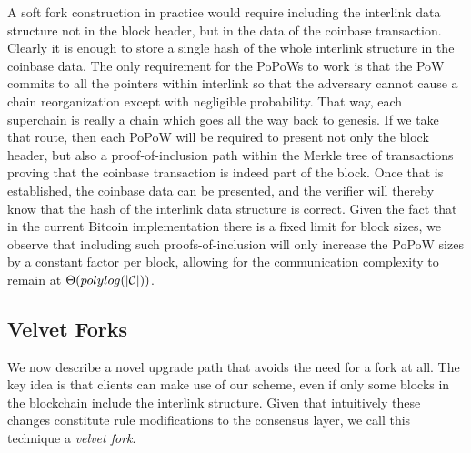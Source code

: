   A soft fork construction in practice would require including the interlink data structure
not in the block header, but in the data of the coinbase transaction.  Clearly
it is enough to store a single hash of the whole interlink structure in the
coinbase data. The only requirement for the PoPoWs to work is that the
PoW commits to all the pointers within interlink so that the adversary cannot
cause a chain reorganization except with negligible probability. That way, each
superchain is really a chain which goes all the way back to genesis. If we take
that route, then each PoPoW will be required to present not only the block
header, but also a proof-of-inclusion path within the Merkle tree of
transactions proving that the coinbase transaction is indeed part of the block.
Once that is established, the coinbase data can be presented, and the verifier
will thereby know that the hash of the interlink data structure is correct.
Given the fact that in the current Bitcoin implementation there is a fixed
limit for block sizes, we observe that including such proofs-of-inclusion will
only increase the PoPoW sizes by a constant factor per block, allowing for the
communication complexity to remain at $\Theta(polylog(|\mathcal{C}|))$.


\subsection{Velvet Forks}
We now describe a novel upgrade path that avoids the need for a fork at all.
The key idea is that clients can make use of our scheme, even if only some blocks in the blockchain include the interlink structure.
Given that intuitively these
changes constitute rule modifications to the consensus layer, we call this
technique a \textit{velvet fork}.

